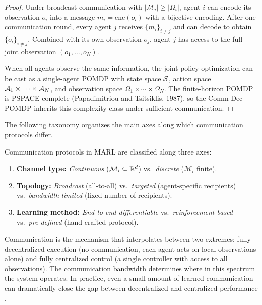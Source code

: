\documentclass[11pt,a4paper]{article}
\begin{document}
\begin{proof}
Under broadcast communication with $|\mathcal{M}_i| \geq
|\Omega_i|$, agent $i$ can encode its observation $o_i$ into
a message $m_i = \text{enc}(o_i)$ with a bijective encoding.
After one communication round, every agent $j$ receives
$\{m_i\}_{i \neq j}$ and can decode to obtain $\{o_i\}_{i \neq
j}$.  Combined with its own observation $o_j$, agent $j$ has
access to the full joint observation $(o_1, \ldots, o_N)$.

When all agents observe the same information, the joint policy
optimization can be cast as a single-agent POMDP with state space
$\mathcal{S}$, action space $\mathcal{A}_1 \times \cdots \times
\mathcal{A}_N$, and observation space $\Omega_1 \times \cdots \times
\Omega_N$.  The finite-horizon POMDP is PSPACE-complete (Papadimitriou
and Tsitsiklis, 1987), so the Comm-Dec-POMDP inherits this
complexity class under sufficient communication.
\end{proof}

The following taxonomy organizes the main axes along which
communication protocols differ.

\begin{definition}
\label{def:comm-taxonomy}
Communication protocols in MARL are classified along three axes:
\begin{enumerate}[nosep]
  \item \textbf{Channel type:} \emph{Continuous}
    ($\mathcal{M}_i \subseteq \mathbb{R}^d$) vs.\ \emph{discrete}
    ($\mathcal{M}_i$ finite).
  \item \textbf{Topology:} \emph{Broadcast} (all-to-all) vs.\
    \emph{targeted} (agent-specific recipients) vs.\
    \emph{bandwidth-limited} (fixed number of recipients).
  \item \textbf{Learning method:} \emph{End-to-end
    differentiable} vs.\ \emph{reinforcement-based} vs.\
    \emph{pre-defined} (hand-crafted protocol).
\end{enumerate}
\end{definition}

\begin{rlconnection}[title={Bridging Centralized and Decentralized
    Performance}]
Communication is the mechanism that interpolates between two
extremes: fully decentralized execution (no communication, each
agent acts on local observations alone) and fully centralized
control (a single controller with access to all observations).
The communication bandwidth determines where in this spectrum
the system operates.  In practice, even a small amount of learned
communication can dramatically close the gap between decentralized
and centralized performance \citep{sukhbaatar2016}.
\end{rlconnection}
\end{document}
